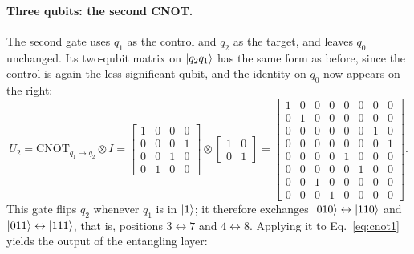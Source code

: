 \documentclass[12pt]{article}
\numberwithin{equation}{section}  %
\begin{document}
\paragraph{Three qubits: the second CNOT.} The second gate uses $q_1$ as the control and $q_2$ as the target, and leaves $q_0$ unchanged. Its two-qubit matrix on $\ket{q_2 q_1}$ has the same form as before, since the control is again the less significant qubit, and the identity on $q_0$ now appears on the right:
\begin{equation}
U_2 = \mathrm{CNOT}_{q_1 \to q_2} \otimes I
= \begin{bmatrix} 1 & 0 & 0 & 0 \\ 0 & 0 & 0 & 1 \\ 0 & 0 & 1 & 0 \\ 0 & 1 & 0 & 0 \end{bmatrix} \otimes
\begin{bmatrix} 1 & 0 \\ 0 & 1 \end{bmatrix}
= \begin{bmatrix}
1&0&0&0&0&0&0&0\\
0&1&0&0&0&0&0&0\\
0&0&0&0&0&0&1&0\\
0&0&0&0&0&0&0&1\\
0&0&0&0&1&0&0&0\\
0&0&0&0&0&1&0&0\\
0&0&1&0&0&0&0&0\\
0&0&0&1&0&0&0&0
\end{bmatrix}.
\label{eq:entanglematrix2}
\end{equation}
This gate flips $q_2$ whenever $q_1$ is in $\ket{1}$; it therefore exchanges $\ket{010} \leftrightarrow \ket{110}$ and $\ket{011} \leftrightarrow \ket{111}$, that is, positions $3 \leftrightarrow 7$ and $4 \leftrightarrow 8$. Applying it to Eq.~\eqref{eq:cnot1} yields the output of the entangling layer:
\end{document}
